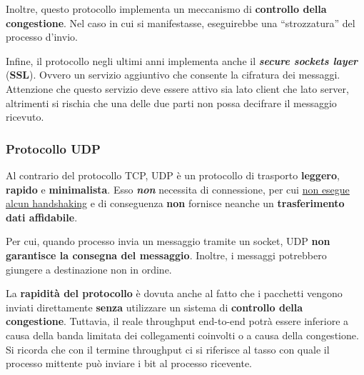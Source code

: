 \documentclass[a4paper]{article}
\newcommand{\dquotes}[1]{``#1''}
\begin{document}
	\noindent
	Inoltre, questo protocollo implementa un meccanismo di \textbf{controllo della congestione}. Nel caso in cui si manifestasse, eseguirebbe una \dquotes{strozzatura} del processo d’invio.\newline
	
	\noindent
	Infine, il protocollo negli ultimi anni implementa anche il \textbf{\emph{secure sockets layer}} (\textbf{SSL}). Ovvero un servizio aggiuntivo che consente la cifratura dei messaggi. Attenzione che questo servizio deve essere attivo sia lato client che lato server, altrimenti si rischia che una delle due parti non possa decifrare il messaggio ricevuto.
	
	\newpage
		
	\subsubsection{Protocollo UDP}
	
	Al contrario del protocollo TCP, UDP è un protocollo di trasporto \textbf{leggero}, \textbf{rapido} e \textbf{minimalista}. Esso \emph{\textbf{non}} necessita di connessione, per cui \underline{non esegue} \underline{alcun handshaking} e di conseguenza \textbf{non} fornisce neanche un \textbf{trasferimento dati affidabile}.\newline
	
	\noindent
	Per cui, quando processo invia un messaggio tramite un socket, UDP \textbf{non garantisce la consegna del messaggio}. Inoltre, i messaggi potrebbero giungere a destinazione non in ordine.\newline
	
	\noindent
	La \textbf{rapidità del protocollo} è dovuta anche al fatto che i pacchetti vengono inviati direttamente \textbf{senza} utilizzare un sistema di \textbf{controllo della congestione}. Tuttavia, il reale throughput end-to-end potrà essere inferiore a causa della banda limitata dei collegamenti coinvolti o a causa della congestione. Si ricorda che con il termine throughput ci si riferisce al tasso con quale il processo mittente può inviare i bit al processo ricevente.
	
\end{document}
